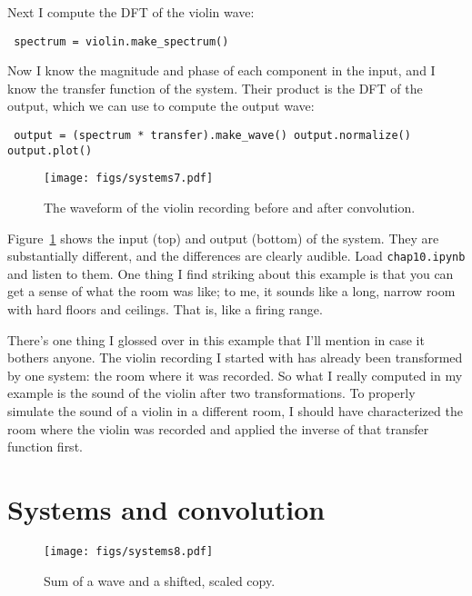 \documentclass[12pt]{book} \usepackage[width=5.5in,height=8.5in, hmarginratio=3:2,vmarginratio=1:1]{geometry}
\begin{document}
Next I compute the DFT of the violin wave: 

\begin{verbatim} spectrum = violin.make_spectrum() \end{verbatim} 

Now I know the magnitude and phase of each component in the input, and I know the transfer function of the system. Their product is the DFT of the output, which we can use to compute the output wave: 

\begin{verbatim} output = (spectrum * transfer).make_wave() output.normalize() output.plot() \end{verbatim} 

\begin{figure} 

\centerline{\texttt{[image: figs/systems7.pdf]}} \caption{The waveform of the violin recording before and after convolution.} \label{fig.systems7} \end{figure} 

Figure~\ref{fig.systems7} shows the input (top) and output (bottom) of the system. They are substantially different, and the differences are clearly audible. Load {\tt chap10.ipynb} and listen to them. One thing I find striking about this example is that you can get a sense of what the room was like; to me, it sounds like a long, narrow room with hard floors and ceilings. That is, like a firing range. 

There's one thing I glossed over in this example that I'll mention in case it bothers anyone. The violin recording I started with has already been transformed by one system: the room where it was recorded. So what I really computed in my example is the sound of the violin after two transformations. To properly simulate the sound of a violin in a different room, I should have characterized the room where the violin was recorded and applied the inverse of that transfer function first. 

\section{Systems and convolution} \label{sysconv} 

\begin{figure} 

\centerline{\texttt{[image: figs/systems8.pdf]}} \caption{Sum of a wave and a shifted, scaled copy.} \label{fig.systems8} \end{figure} 
\end{document}
